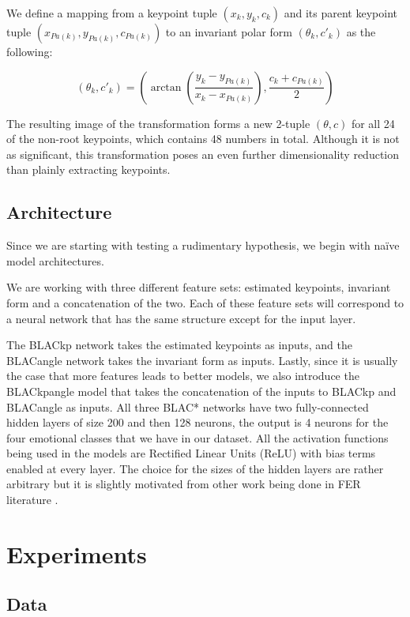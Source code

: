 \documentclass{article}
\begin{document}
We define a mapping from a keypoint tuple $(x_k,y_k,c_k)$ and its parent keypoint tuple $(x_{Pa(k)},y_{Pa(k)},c_{Pa(k)})$ to an invariant polar form $(\theta_k,c'_k)$ as the following:

$$
(\theta_k,c'_k) = \left(\arctan \left(\frac{y_k -y_{Pa(k)}}{x_k -x_{Pa(k)}} \right), \frac{c_k + c_{Pa(k)}}{2}\right)
$$

The resulting image of the transformation forms a new 2-tuple $(\theta, c)$ for all 24 of the non-root keypoints, which contains 48 numbers in total. Although it is not as significant, this transformation poses an even further dimensionality reduction than plainly extracting keypoints.

\subsection{Architecture}

Since we are starting with testing a rudimentary hypothesis, we begin with na\"ive model architectures.

We are working with three different feature sets: estimated keypoints, invariant form and a concatenation of the two. Each of these feature sets will correspond to a neural network that has the same structure except for the input layer. 

The BLACkp network takes the estimated keypoints as inputs, and the BLACangle network takes the invariant form as inputs. Lastly, since it is usually the case that more features leads to better models, we also introduce the BLACkpangle model that takes the concatenation of the inputs to BLACkp and BLACangle as inputs. All three BLAC* networks have two fully-connected hidden layers of size 200 and then 128 neurons, the output is 4 neurons for the four emotional classes that we have in our dataset. All the activation functions being used in the models are Rectified Linear Units (ReLU) with bias terms enabled at every layer. The choice for the sizes of the hidden layers are rather arbitrary but it is slightly motivated from other work being done in FER literature \citep{dachapally2017facial}.

\section{Experiments}

\subsection{Data}
\end{document}
